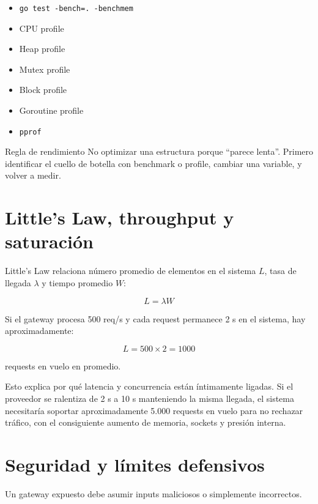 \documentclass[11pt,a4paper]{article}
\newcommand{\code}[1]{\texttt{#1}}
\begin{document}
\begin{itemize}
  \item \code{go test -bench=. -benchmem}
  \item CPU profile
  \item Heap profile
  \item Mutex profile
  \item Block profile
  \item Goroutine profile
  \item \code{pprof}
\end{itemize}

\begin{conceptbox}{Regla de rendimiento}
No optimizar una estructura porque ``parece lenta''. Primero identificar el cuello de botella con benchmark o profile, cambiar una variable, y volver a medir.
\end{conceptbox}

\section{Little's Law, throughput y saturación}

Little's Law relaciona número promedio de elementos en el sistema $L$, tasa de llegada $\lambda$ y tiempo promedio $W$:

\[
L = \lambda W
\]

Si el gateway procesa 500 req/s y cada request permanece 2 s en el sistema, hay aproximadamente:

\[
L = 500 \times 2 = 1000
\]

requests en vuelo en promedio.

Esto explica por qué latencia y concurrencia están íntimamente ligadas. Si el proveedor se ralentiza de 2 s a 10 s manteniendo la misma llegada, el sistema necesitaría soportar aproximadamente 5.000 requests en vuelo para no rechazar tráfico, con el consiguiente aumento de memoria, sockets y presión interna.

\section{Seguridad y límites defensivos}

Un gateway expuesto debe asumir inputs maliciosos o simplemente incorrectos.
\end{document}
